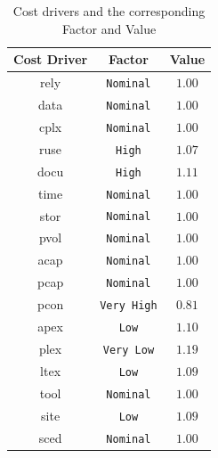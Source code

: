 \begin{table}[htbp]
\begin{center}
\begin{tabular}[t]{ccc}

\hline
\textbf{Cost Driver} & \textbf{Factor} & \textbf{Value} \\
\hline
\acs{rely} & \texttt{Nominal} &  $1.00$\\
\hline
\acs{data} & \texttt{Nominal} & $1.00$\\
\hline
\acs{cplx}&  \texttt{Nominal} &  $1.00$\\
\hline
\acs{ruse} & \texttt{High} &  $1.07$\\
\hline
\acs{docu} & \texttt{High} & $1.11$ \\
\hline
\acs{time} & \texttt{Nominal} & $1.00$ \\
\hline
\acs{stor} & \texttt{Nominal} & $1.00$ \\
\hline
\acs{pvol} & \texttt{Nominal} & $1.00$ \\
\hline
\acs{acap} & \texttt{Nominal} & $1.00$ \\
\hline
\acs{pcap} & \texttt{Nominal} & $1.00$\\
\hline
\acs{pcon} & \texttt{Very High} & $0.81$ \\
\hline
\acs{apex} & \texttt{Low} & $1.10$ \\
\hline
\acs{plex} & \texttt{Very Low} & $1.19$ \\
\hline
\acs{ltex} & \texttt{Low} & $1.09$ \\
\hline
\acs{tool} & \texttt{Nominal} & $1.00$ \\
\hline
\acs{site} & \texttt{Low} & $1.09$ \\
\hline
\acs{sced} & \texttt{Nominal} & $1.00$ \\
\hline

\end{tabular}
\caption{Cost drivers and the corresponding Factor and Value}
\end{center}
\end{table}

